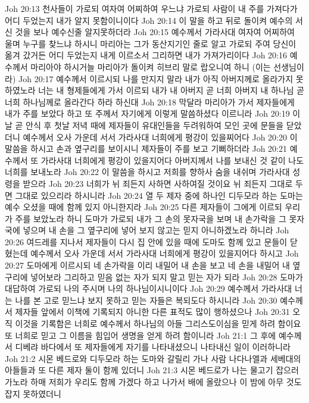 Joh 20:13  천사들이 가로되 여자여 어찌하여 우느냐 가로되 사람이 내 주를 가져다가 어디 두었는지 내가 알지 못함이니이다
Joh 20:14  이 말을 하고 뒤로 돌이켜 예수의 서신 것을 보나 예수신줄 알지못하더라
Joh 20:15  예수께서 가라사대 여자여 어찌하여 울며 누구를 찾느냐 하시니 마리아는 그가 동산지기인 줄로 알고 가로되 주여 당신이 옮겨 갔거든 어디 두었는지 내게 이르소서 그리하면 내가 가져가리이다
Joh 20:16  예수께서 마리아야 하시거늘 마리아가 돌이켜 히브리 말로 랍오니여 하니 (이는 선생님이라)
Joh 20:17  예수께서 이르시되 나를 만지지 말라 내가 아직 아버지께로 올라가지 못하였노라 너는 내 형제들에게 가서 이르되 내가 내 아버지 곧 너희 아버지 내 하나님 곧 너희 하나님께로 올라간다 하라 하신대
Joh 20:18  막달라 마리아가 가서 제자들에게 내가 주를 보았다 하고 또 주께서 자기에게 이렇게 말씀하셨다 이르니라
Joh 20:19  이 날 곧 안식 후 첫날 저녁 때에 제자들이 유대인들을 두려워하여 모인 곳에 문들을 닫았더니 예수께서 오사 가운데 서서 가라사대 너희에게 평강이 있을찌어다
Joh 20:20  이 말씀을 하시고 손과 옆구리를 보이시니 제자들이 주를 보고 기뻐하더라
Joh 20:21  예수께서 또 가라사대 너희에게 평강이 있을지어다 아버지께서 나를 보내신 것 같이 나도 너희를 보내노라
Joh 20:22  이 말씀을 하시고 저희를 향하사 숨을 내쉬며 가라사대 성령을 받으라
Joh 20:23  너희가 뉘 죄든지 사하면 사하여질 것이요 뉘 죄든지 그대로 두면 그대로 있으리라 하시니라
Joh 20:24  열 두 제자 중에 하나인 디두모라 하는 도마는 예수 오셨을 때에 함께 있지 아니한지라
Joh 20:25  다른 제자들이 그에게 이르되 우리가 주를 보았노라 하니 도마가 가로되 내가 그 손의 못자국을 보며 내 손가락을 그 못자국에 넣으며 내 손을 그 옆구리에 넣어 보지 않고는 믿지 아니하겠노라 하니라
Joh 20:26  여드레를 지나서 제자들이 다시 집 안에 있을 때에 도마도 함께 있고 문들이 닫혔는데 예수께서 오사 가운데 서서 가라사대 너희에게 평강이 있을지어다 하시고
Joh 20:27  도마에게 이르시되 네 손가락을 이리 내밀어 내 손을 보고 네 손을 내밀어 내 옆구리에 넣어보라 그리하고 믿음 없는 자가 되지 말고 믿는 자가 되라
Joh 20:28  도마가 대답하여 가로되 나의 주시며 나의 하나님이시니이다
Joh 20:29  예수께서 가라사대 너는 나를 본 고로 믿느냐 보지 못하고 믿는 자들은 복되도다 하시니라
Joh 20:30  예수께서 제자들 앞에서 이책에 기록되지 아니한 다른 표적도 많이 행하셨으나
Joh 20:31  오직 이것을 기록함은 너희로 예수께서 하나님의 아들 그리스도이심을 믿게 하려 함이요 또 너희로 믿고 그 이름을 힘입어 생명을 얻게 하려 함이니라
Joh 21:1  그 후에 예수께서 디베랴 바다에서 또 제자들에게 자기를 나타내셨으니 나타내신 일이 이러하니라
Joh 21:2  시몬 베드로와 디두모라 하는 도마와 갈릴리 가나 사람 나다나엘과 세베대의 아들들과 또 다른 제자 둘이 함께 있더니
Joh 21:3  시몬 베드로가 나는 물고기 잡으러 가노라 하매 저희가 우리도 함께 가겠다 하고 나가서 배에 올랐으나 이 밤에 아무 것도 잡지 못하였더니
